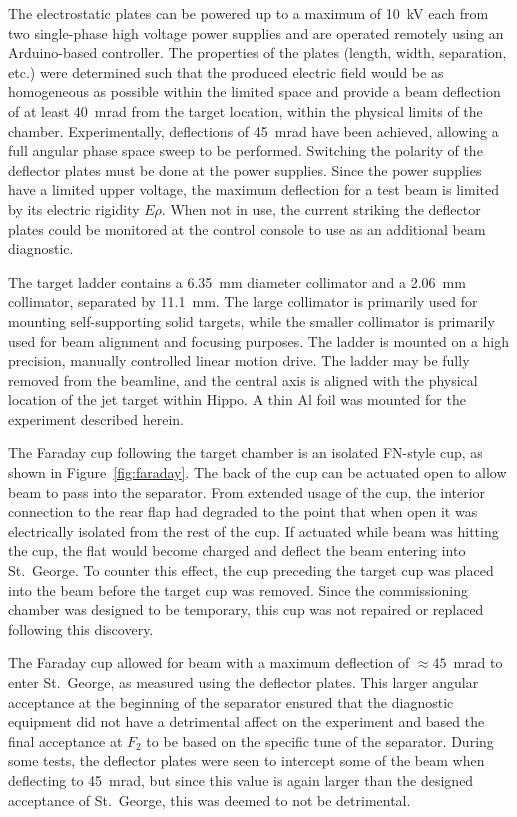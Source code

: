 The electrostatic plates can be powered up to a maximum of 10~kV each from two
single-phase high voltage power supplies and are operated remotely using an
Arduino-based controller. The properties of the plates (length, width,
separation, etc.) were determined such that the produced electric field would
be as homogeneous as possible within the limited space and provide a beam
deflection of at least 40~mrad from the target location, within the physical
limits of the chamber. Experimentally, deflections of 45~mrad have been
achieved, allowing a full angular phase space sweep to be performed. Switching
the polarity of the deflector plates must be done at the power supplies. Since
the power supplies have a limited upper voltage, the maximum deflection for a
test beam is limited by its electric rigidity $E\rho$. When not in use, the
current striking the deflector plates could be monitored at the control console
to use as an additional beam diagnostic.

The target ladder contains a 6.35~mm diameter collimator and a 2.06~mm
collimator, separated by 11.1~mm. The large collimator is primarily used for
mounting self-supporting solid targets, while the smaller collimator is
primarily used for beam alignment and focusing purposes. The ladder is mounted
on a high precision, manually controlled linear motion drive.
The ladder may be fully removed from the beamline, and the central axis is
aligned with the physical location of the jet target within Hippo. A thin Al
foil was mounted for the experiment described herein.

The Faraday cup following the target chamber is an isolated FN-style cup, as
shown in Figure~\ref{fig:faraday}. The back of the cup can be actuated open to allow beam to
pass into the separator. From extended usage of the cup, the interior
connection to the rear flap had degraded to the point that when open it was
electrically isolated from the rest of the cup. If actuated while beam was
hitting the cup, the flat would become charged and deflect the beam entering
into St.\ George. To counter this effect, the cup preceding the target cup was
placed into the beam before the target cup was removed. Since the commissioning
chamber was designed to be temporary, this cup was not repaired or replaced
following this discovery.

The Faraday cup allowed for beam with a maximum deflection of $\approx 45$~mrad to
enter St.\ George, as measured using the deflector plates. This larger angular
acceptance at the beginning of the separator ensured that the diagnostic
equipment did not have a detrimental affect on the experiment and based the
final acceptance at $F_2$ to be based on the specific tune of the separator.
During some tests, the deflector plates were seen to intercept some of the beam
when deflecting to 45~mrad, but since this value is again larger than the
designed acceptance of St.\ George, this was deemed to not be detrimental.
